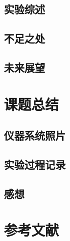 \documentclass[12pt,hyperref,a4paper,UTF8]{ctexart}
\begin{document}
\subsection{实验综述}

\subsection{不足之处}

\subsection{未来展望}

\section{课题总结}
\subsection{仪器系统照片}

\subsection{实验过程记录}

\subsection{感想}


\section{参考文献}

\end{document}
